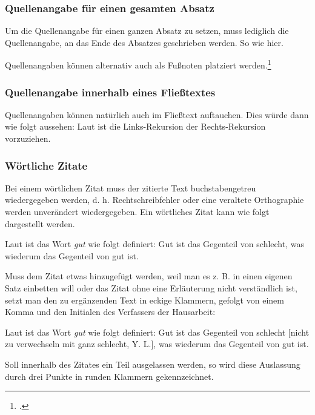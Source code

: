 \subsubsection{Quellenangabe für einen gesamten Absatz}

Um die Quellenangabe für einen ganzen Absatz zu setzen, muss lediglich die Quellenangabe, an das Ende des Absatzes geschrieben werden. So wie hier.\\
\parencite[3-5]{angenendt}

Quellenangaben können alternativ auch als Fußnoten platziert werden.\footcite[7-14]{angenendt}


\subsubsection{Quellenangabe innerhalb eines Fließtextes}

Quellenangaben können natürlich auch im Fließtext auftauchen. Dies würde dann wie folgt aussehen: Laut \textcite[51]{angenendt} ist die Links-Rekursion der Rechts-Rekursion vorzuziehen.


\subsubsection{Wörtliche Zitate}

Bei einem wörtlichen Zitat muss der zitierte Text buchstabengetreu wiedergegeben werden, d. h. Rechtschreibfehler oder eine veraltete Orthographie werden unverändert wiedergegeben. Ein wörtliches Zitat kann wie folgt dargestellt werden.

Laut \textcite[55-56]{angenendt} ist das Wort \emph{gut} wie folgt definiert: \glqq Gut ist das Gegenteil von schlecht, was wiederum das Gegenteil von gut ist.\grqq

Muss dem Zitat etwas hinzugefügt werden, weil man es z. B. in einen eigenen Satz einbetten will oder das Zitat ohne eine Erläuterung nicht verständlich ist, setzt man den zu ergänzenden Text in eckige Klammern, gefolgt von einem Komma und den Initialen des Verfassers der Hausarbeit:

Laut \textcite[55-56]{angenendt} ist das Wort \emph{gut} wie folgt definiert: \glqq Gut ist das Gegenteil von schlecht [nicht zu verwechseln mit ganz schlecht, Y. L.], was wiederum das Gegenteil von gut ist.\grqq

Soll innerhalb des Zitates ein Teil ausgelassen werden, so wird diese Auslassung durch drei Punkte in runden Klammern gekennzeichnet.

